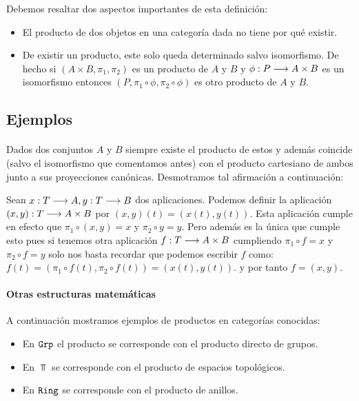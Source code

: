 Debemos resaltar dos aspectos importantes de esta definición:
\begin{itemize}
\item El producto de dos objetos en una categoría dada no tiene por qué
      existir.
\item De existir un producto, este solo queda determinado salvo isomorfismo. De hecho si $(A\times B, \pi_1, \pi_2)$ es un producto de $A$ y $B$
y $\phi : P\longrightarrow A\times B$ es un isomorfismo entonces
$(P, \pi_1 \circ \phi , \pi_2 \circ \phi)$ es otro producto de $A$
y $B$.
\end{itemize}

\subsection{Ejemplos}
\paragraph{\Set}
Dados dos conjuntos $A$ y $B$ siempre existe el producto de estos
y además coincide (salvo el isomorfismo
que comentamos antes) con el producto cartesiano de ambos
junto a sus proyecciones canónicas. Desmotramos tal
afirmación a continuación:

Sean $x: T\longrightarrow A, y: T\longrightarrow B$ dos aplicaciones. Podemos
definir la aplicación $(x, y) :T\longrightarrow A\times B$ por
$(x, y)(t) = (x(t), y(t))$. Esta aplicación cumple en efecto que
$\pi_1 \circ (x, y) = x$ y $\pi_2 \circ y = y$. Pero además es la única
que cumple esto pues si tenemos otra aplicación
$f : T\longrightarrow A\times B$ cumpliendo $\pi_1 \circ f = x$ y
$\pi_2 \circ f = y$ solo nos basta recordar que podemos
escribir $f$ como:
$f(t)=(\pi_1\circ f(t), \pi_2\circ f(t))=(x(t), y(t))$.
y por tanto $f = (x, y)$.

\paragraph{Otras estructuras matemáticas}
A continuación mostramos ejemplos de productos
en categorías conocidas:

\begin{itemize}
\item En $\texttt{Grp}$ el producto se corresponde con el
producto directo de grupos.
\item En $\Top$ se corresponde con el producto de espacios topológicos.
\item En $\texttt{Ring}$ se corresponde con el producto de anillos.
\end{itemize}

